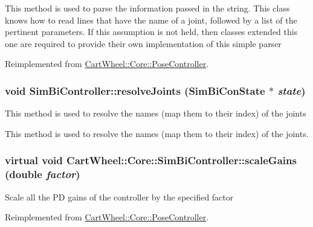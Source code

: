 This method is used to parse the information passed in the string. This class knows how to read lines that have the name of a joint, followed by a list of the pertinent parameters. If this assumption is not held, then classes extended this one are required to provide their own implementation of this simple parser 

Reimplemented from \hyperlink{classCartWheel_1_1Core_1_1PoseController_ad05d09982370d04e508b54bebf7ba8a1}{CartWheel::Core::PoseController}.

\hypertarget{classCartWheel_1_1Core_1_1SimBiController_a788b1c8702161ce7c9b3e4b424277543}{
\subsubsection[{resolveJoints}]{\setlength{\rightskip}{0pt plus 5cm}void SimBiController::resolveJoints ({\bf SimBiConState} $\ast$ {\em state})}}
\label{classCartWheel_1_1Core_1_1SimBiController_a788b1c8702161ce7c9b3e4b424277543}
This method is used to resolve the names (map them to their index) of the joints

This method is used to resolve the names (map them to their index) of the joints. \hypertarget{classCartWheel_1_1Core_1_1SimBiController_a07bdc28113f2c5d77ecd3d4b144faa8d}{
\subsubsection[{scaleGains}]{\setlength{\rightskip}{0pt plus 5cm}virtual void CartWheel::Core::SimBiController::scaleGains (double {\em factor})}}
\label{classCartWheel_1_1Core_1_1SimBiController_a07bdc28113f2c5d77ecd3d4b144faa8d}
Scale all the PD gains of the controller by the specified factor 

Reimplemented from \hyperlink{classCartWheel_1_1Core_1_1PoseController_a943dbb6a3cc2ea8c4897cb4979983cea}{CartWheel::Core::PoseController}.

